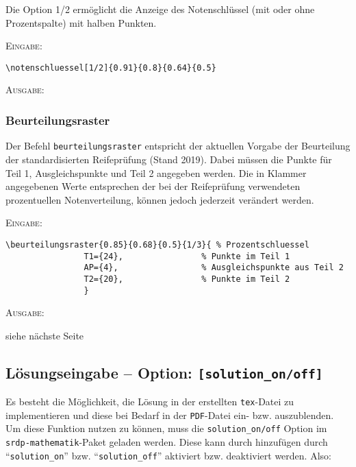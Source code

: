 \documentclass[a4paper,12pt]{article}
\begin{document}
Die Option 1/2 ermöglicht die Anzeige des Notenschlüssel (mit oder ohne Prozentspalte) mit halben Punkten. 

\textsc{Eingabe:}
\begin{verbatim}
\notenschluessel[1/2]{0.91}{0.8}{0.64}{0.5}
\end{verbatim}

\textsc{Ausgabe:}

\subsubsection{Beurteilungsraster}

Der Befehl \texttt{beurteilungsraster} entspricht der aktuellen Vorgabe der Beurteilung der standardisierten Reifeprüfung (Stand 2019). Dabei müssen die Punkte für Teil 1, Ausgleichspunkte und Teil 2 angegeben werden. Die in Klammer angegebenen Werte entsprechen der bei der Reifeprüfung verwendeten prozentuellen Notenverteilung, können jedoch jederzeit verändert werden. \leer  


\textsc{Eingabe:}
\begin{verbatim}
\beurteilungsraster{0.85}{0.68}{0.5}{1/3}{ % Prozentschluessel
				T1={24}, 				% Punkte im Teil 1  
				AP={4}, 				% Ausgleichspunkte aus Teil 2  
				T2={20}, 				% Punkte im Teil 2
				} 

\end{verbatim}
\textsc{Ausgabe:}\leer

siehe nächste Seite \newpage



\newpage

\subsection{Lösungseingabe -- Option: \texttt{[solution\_on/off]}}

Es besteht die Möglichkeit, die Lösung in der erstellten \texttt{tex}-Datei zu implementieren und diese bei Bedarf in der \texttt{PDF}-Datei ein- bzw. auszublenden. Um diese Funktion nutzen zu können, muss die \texttt{solution\_on/off} Option im \texttt{srdp-mathematik}-Paket geladen werden. Diese kann durch hinzufügen durch "`\texttt{solution\_on}"' bzw. "`\texttt{solution\_off}"' aktiviert bzw. deaktiviert werden. Also:
\end{document}
